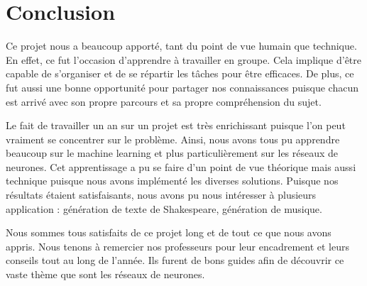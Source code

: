 \chapter*{Conclusion}

Ce projet nous a beaucoup apporté, tant du point de vue humain que technique. En effet, ce fut l'occasion d'apprendre à travailler en groupe. Cela implique d'être capable de s'organiser et de se répartir les tâches pour être efficaces. De plus, ce fut aussi une bonne opportunité pour partager nos connaissances puisque chacun est arrivé avec son propre parcours et sa propre compréhension du sujet.

Le fait de travailler un an sur un projet est très enrichissant puisque l'on peut vraiment se concentrer sur le problème. Ainsi, nous avons tous pu apprendre beaucoup sur le machine learning et plus particulièrement sur les réseaux de neurones. Cet apprentissage a pu se faire d'un point de vue théorique mais aussi technique puisque nous avons implémenté les diverses solutions. Puisque nos résultats étaient satisfaisants, nous avons pu nous intéresser à plusieurs application : génération de texte de Shakespeare, génération de musique.

Nous sommes tous satisfaits de ce projet long et de tout ce que nous avons appris. Nous tenons à remercier nos professeurs pour leur encadrement et leurs conseils tout au long de l'année. Ils furent de bons guides afin de découvrir ce vaste thème que sont les réseaux de neurones.